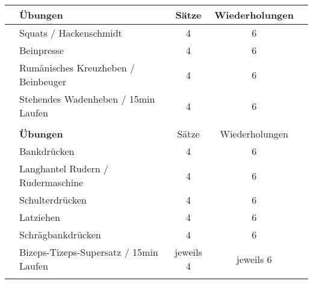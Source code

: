 \documentclass{article}
\begin{document}
\begin{table}[ht]
  \centering
  \Large
  \begin{tabular}{c|lccc}

    \rowcolor[HTML]{FFCE93} & \textbf{Übungen}             & Sätze     & Wiederholungen & \\ \hline
    \rowcolor[HTML]{EFEFEF} & Squats / Hackenschmidt                       & 4         & 6              & \\
    \rowcolor[HTML]{FFFFFF} & Beinpresse                   & 4         & 6              & \\
    \rowcolor[HTML]{EFEFEF} & Rumänisches Kreuzheben / Beinbeuger       & 4         & 6              & \\
    \rowcolor[HTML]{FFFFFF} & Stehendes Wadenheben / 15min Laufen         & 4         & 6              & \\ \hline
                            &                              &           &                & \\
    \rowcolor[HTML]{FFCE93} & \textbf{Übungen}             & Sätze     & Wiederholungen & \\ \hline
    \rowcolor[HTML]{EFEFEF} & Bankdrücken                  & 4         & 6              & \\
    \rowcolor[HTML]{FFFFFF} & Langhantel Rudern / Rudermaschine            & 4         & 6              & \\
    \rowcolor[HTML]{EFEFEF} & Schulterdrücken              & 4         & 6              & \\
    \rowcolor[HTML]{FFFFFF} & Latziehen                    & 4         & 6              & \\
    \rowcolor[HTML]{EFEFEF} & Schrägbankdrücken & 4         & 6              & \\
    \rowcolor[HTML]{FFFFFF} & Bizeps-Tizeps-Supersatz / 15min Laufen  & jeweils 4 & jeweils 6      & \\ \hline
                            &                              &           &                & \\


\end{tabular}
\end{table}
\end{document}
